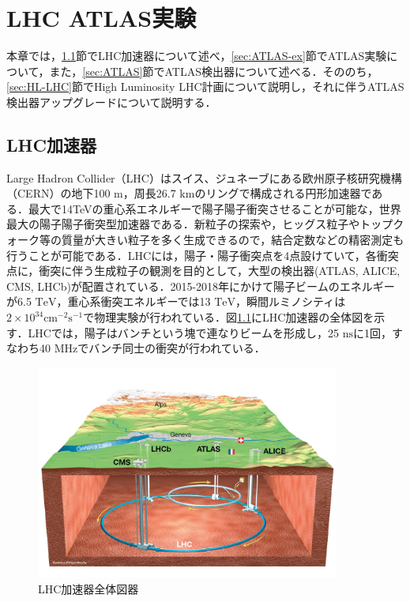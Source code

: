 \chapter{LHC ATLAS実験}
本章では，\ref{sec:LHC}節でLHC加速器について述べ，\ref{sec:ATLAS-ex}節でATLAS実験について，また，\ref{sec:ATLAS}節でATLAS検出器について述べる．そののち，\ref{sec:HL-LHC}節でHigh Luminosity LHC計画について説明し，それに伴うATLAS検出器アップグレードについて説明する．\par
\section{LHC加速器}
\label{sec:LHC}
Large Hadron Collider（LHC）はスイス、ジュネーブにある欧州原子核研究機構（CERN）の地下100 $\mathrm{m}$，周長26.7 $\mathrm{km}$のリングで構成される円形加速器である．最大で14TeVの重心系エネルギーで陽子陽子衝突させることが可能な，世界最大の陽子陽子衝突型加速器である．新粒子の探索や，ヒッグス粒子やトップクォーク等の質量が大きい粒子を多く生成できるので，結合定数などの精密測定も行うことが可能である．LHCには，陽子・陽子衝突点を4点設けていて，各衝突点に，衝突に伴う生成粒子の観測を目的として，大型の検出器(ATLAS, ALICE, CMS, LHCb)が配置されている．2015-2018年にかけて陽子ビームのエネルギーが6.5 $\mathrm{TeV}$，重心系衝突エネルギーでは13 $\mathrm{TeV}$，瞬間ルミノシティは$2\times 10^34 \mathrm{cm^{-2}s^{-1}}$で物理実験が行われている．図\ref{fig:LHC}にLHC加速器の全体図を示す．LHCでは，陽子はバンチという塊で連なりビームを形成し，25 $\mathrm{ns}$に1回，すなわち40 $\mathrm{MHz}$でバンチ同士の衝突が行われている．\par

\begin{figure}[h]
  \centering
  \includegraphics[width=10cm]{./figure/LHC.png}
  \caption{LHC加速器全体図器\cite{Collaboration_2008}}
  \label{fig:LHC}
\end{figure}

